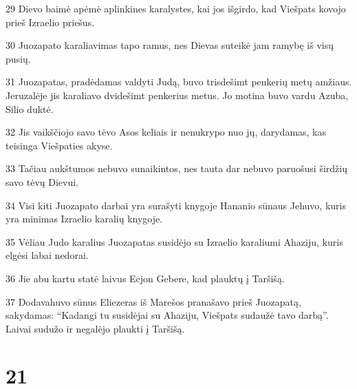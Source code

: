 \par 29 Dievo baimė apėmė aplinkines karalystes, kai jos išgirdo, kad Viešpats kovojo prieš Izraelio priešus. 
\par 30 Juozapato karaliavimas tapo ramus, nes Dievas suteikė jam ramybę iš visų pusių. 
\par 31 Juozapatas, pradėdamas valdyti Judą, buvo trisdešimt penkerių metų amžiaus. Jeruzalėje jis karaliavo dvidešimt penkerius metus. Jo motina buvo vardu Azuba, Silio duktė. 
\par 32 Jis vaikščiojo savo tėvo Asos keliais ir nenukrypo nuo jų, darydamas, kas teisinga Viešpaties akyse. 
\par 33 Tačiau aukštumos nebuvo sunaikintos, nes tauta dar nebuvo paruošusi širdžių savo tėvų Dievui. 
\par 34 Visi kiti Juozapato darbai yra surašyti knygoje Hananio sūnaus Jehuvo, kuris yra minimas Izraelio karalių knygoje. 
\par 35 Vėliau Judo karalius Juozapatas susidėjo su Izraelio karaliumi Ahaziju, kuris elgėsi labai nedorai. 
\par 36 Jie abu kartu statė laivus Ecjon Gebere, kad plauktų į Taršišą. 
\par 37 Dodavahuvo sūnus Eliezeras iš Marešos pranašavo prieš Juozapatą, sakydamas: “Kadangi tu susidėjai su Ahaziju, Viešpats sudaužė tavo darbą”. Laivai sudužo ir negalėjo plaukti į Taršišą.



\chapter{21}

